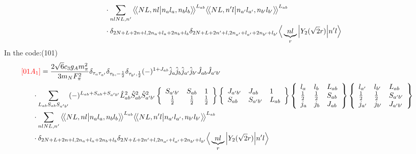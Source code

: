 \documentclass[master]{shnuthesis}
\newcommand{\llangle}{\big\langle\!\big\langle}
\newcommand{\rrangle}{\big\rangle\!\big\rangle}
\newcommand{\ap}{a^\prime}
\newcommand{\bp}{b^\prime}
\newcommand{\il}{\!\!\!\!\!\!\!\!\!\!}
\begin{document}
\begin{align}
    & \cdot \sum_{nlNL,n^\prime} \llangle N L, n l \big| n_{a} l_{a}, n_{b} l_{b} \rrangle^{L_{ab}} \llangle N L, n^\prime l \big| n_{a^\prime} l_{a^\prime}, n_{b^\prime} l_{b^\prime} \rrangle^{L_{ab}} \notag\\
    & \cdot \delta_{2N+L+2n+l,2n_a+l_a+2n_b+l_b}\delta_{2N+L+2n^\prime+l,2n_{a^\prime}+l_{a^\prime}+2n_{b^\prime}+l_{b^\prime}} \Big\langle \underbrace{n l}_{r} \Big| Y_2(\sqrt{2}r) \Big| n^\prime l \Big\rangle
\end{align}
In the code:(101)
\begin{align}
    &\il {\color{red} [01A_1]}= \frac{2\sqrt{6}c_3g_A m_\pi^2}{3m_N F_{\pi}^2} \delta_{\tau_a \tau_{\ap}}\delta_{\tau_b, -\frac{1}{2}}\delta_{\tau_{\bp}, \frac{1}{2}} (-)^{1+J_{ab}}\hat{j}_a\hat{j}_b\hat{j}_{\ap}\hat{j}_{\bp}\hat{J}_{ab}\hat{J}_{\ap\bp}  \notag\\
    & \cdot \sum_{L_{ab}S_{ab}S_{\ap\bp}} (-)^{L_{ab}+S_{ab}+S_{\ap\bp}} \hat{L}_{ab}^2\hat{S}_{ab}^2\hat{S}_{\ap\bp}^2  \left\{\begin{array}{ccc} S_{\ap\bp} & S_{ab} & 1 \\ \frac{1}{2} & \frac{1}{2} & \frac{1}{2} \end{array}\right\}  \left\{\begin{array}{lll} J_{\ap\bp} & J_{ab} & 1 \\ S_{ab} & S_{\ap\bp} & L_{ab} \end{array}\right\}  \left\{\begin{array}{lll}l_{a} & l_{b} & L_{ab} \\ \frac{1}{2} & \frac{1}{2} & S_{ab} \\j_{a} & j_{b} & J_{ab} \end{array}\right\} \left\{\begin{array}{lll} l_{\ap} & l_{\bp} & L_{ab} \\ \frac{1}{2} & \frac{1}{2} & S_{\ap\bp} \\j_{\ap} & j_{\bp} & J_{\ap\bp} \end{array}\right\}  \notag \\
    & \cdot \sum_{nlNL,n^\prime} \llangle N L, n l \big| n_{a} l_{a}, n_{b} l_{b} \rrangle^{L_{ab}} \llangle N L, n^\prime l \big| n_{a^\prime} l_{a^\prime}, n_{b^\prime} l_{b^\prime} \rrangle^{L_{ab}} \notag\\
    & \cdot \delta_{2N+L+2n+l,2n_a+l_a+2n_b+l_b}\delta_{2N+L+2n^\prime+l,2n_{a^\prime}+l_{a^\prime}+2n_{b^\prime}+l_{b^\prime}} \Big\langle \underbrace{n l}_{r} \Big| Y_2(\sqrt{2}r) \Big| n^\prime l \Big\rangle
\end{align}
\end{document}
